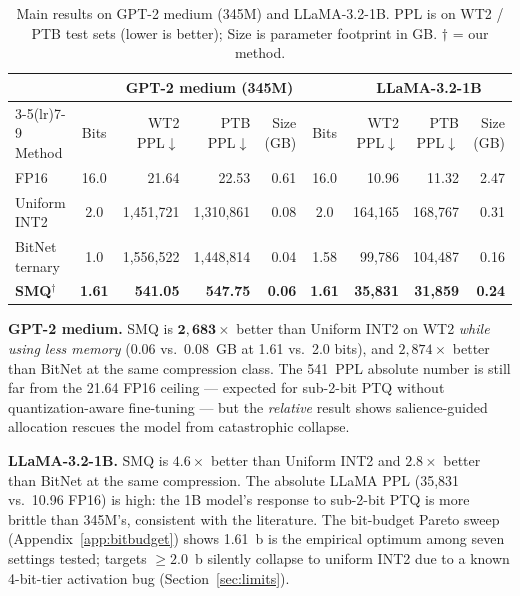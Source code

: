 \documentclass[11pt]{article}
\begin{document}
\begin{table}[h]
\centering
\small
\caption{Main results on GPT-2 medium (345M) and LLaMA-3.2-1B.
PPL is on WT2 / PTB test sets (lower is better); Size is parameter footprint in GB.
$\dagger$ = our method.}
\label{tab:main}\label{tab:gpt2_main}\label{tab:llama_main}
\setlength{\tabcolsep}{6pt}
\renewcommand{\arraystretch}{1.05}
\begin{tabular}{@{}lc rrr c rrr@{}}
\toprule
& & \multicolumn{3}{c}{\textbf{GPT-2 medium (345M)}} & & \multicolumn{3}{c}{\textbf{LLaMA-3.2-1B}} \\
\cmidrule(lr){3-5}\cmidrule(lr){7-9}
Method & Bits & WT2 PPL$\downarrow$ & PTB PPL$\downarrow$ & Size (GB) & Bits & WT2 PPL$\downarrow$ & PTB PPL$\downarrow$ & Size (GB) \\
\midrule
FP16             & 16.0  & 21.64       & 22.53       & 0.61 & 16.0  & 10.96     & 11.32      & 2.47 \\
Uniform INT2     &  2.0  & 1{,}451{,}721 & 1{,}310{,}861 & 0.08 &  2.0  & 164{,}165 & 168{,}767  & 0.31 \\
BitNet ternary   &  1.0  & 1{,}556{,}522 & 1{,}448{,}814 & 0.04 &  1.58 & 99{,}786  & 104{,}487  & 0.16 \\
\midrule
\textbf{SMQ$^\dagger$} & \textbf{1.61} & \textbf{541.05} & \textbf{547.75} & \textbf{0.06}
                       & \textbf{1.61} & \textbf{35{,}831} & \textbf{31{,}859} & \textbf{0.24} \\
\bottomrule
\end{tabular}
\end{table}

\textbf{GPT-2 medium.}
SMQ is $\mathbf{2{,}683\times}$ better than Uniform INT2 on WT2 \emph{while using less
memory} (0.06 vs.\ 0.08~GB at 1.61 vs.\ 2.0 bits), and $2{,}874\times$ better than BitNet
at the same compression class.
The 541~PPL absolute number is still far from the 21.64 FP16 ceiling --- expected for
sub-2-bit PTQ without quantization-aware fine-tuning --- but the \emph{relative}
result shows salience-guided allocation rescues the model from catastrophic collapse.

\textbf{LLaMA-3.2-1B.}
SMQ is $\mathbf{4.6\times}$ better than Uniform INT2 and $2.8\times$ better than BitNet
at the same compression.
The absolute LLaMA PPL (35{,}831 vs.\ 10.96 FP16) is high: the 1B model's response to
sub-2-bit PTQ is more brittle than 345M's, consistent with the literature.
The bit-budget Pareto sweep (Appendix~\ref{app:bitbudget}) shows 1.61~b is the empirical
optimum among seven settings tested; targets $\geq 2.0$~b silently collapse to uniform
INT2 due to a known 4-bit-tier activation bug (Section~\ref{sec:limits}).
\end{document}
